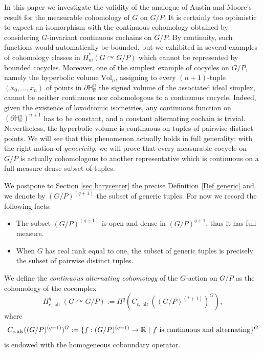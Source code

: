 \documentclass[a4paper]{amsart}
\theoremstyle{definition}
\theoremstyle{remark}
\theoremstyle{TheoremNum}
\DeclareMathOperator{\alt}{\mathrm{alt}}
\begin{document}
 

In this paper we investigate the validity of the analogue of Austin and Moore's result for the measurable cohomology of $G$ on $G/P$. It is certainly too optimistic to expect an isomorphism with the continuous cohomology obtained by considering $G$-invariant continuous cochains on $G/P$. By continuity, such functions would automatically be bounded, but we exhibited in \cite{BucSavExp} several examples of cohomology classes in $H^*_{m}(G \curvearrowright G/P)$ which cannot be represented by bounded cocycles. Moreover, one of the simplest example of cocycles on $G/P$, namely the hyperbolic volume $\mathrm{Vol}_n$, assigning to every $(n+1)$-tuple $(x_0,\ldots,x_n)$ of points in $\partial \mathbb{H}^n_{\mathbb{R}}$ the signed volume of the associated ideal simplex, cannot be neither continuous nor cohomologous to a continuous cocycle. Indeed, given the existence of loxodromic isometries, any continuous function on $(\partial\mathbb{H}^n_\mathbb{R})^{n+1}$ has to be constant, and a constant alternating cochain is trivial. Nevertheless, the hyperbolic volume is continuous on tuples of pairwise distinct points. We will see that this phenomenon actually holds in full generality: with the right notion of \emph{genericity}, we will prove that every measurable cocycle on $G/P$ is actually cohomologous to another representative which is continuous on a full measure dense subset of tuples. 


We postpone to Section \ref{sec barycenter} the precise Definition \ref{Def generic} and we denote by $(G/P)^{(q+1)}$ the subset of generic tuples. For now we record the following facts:
\begin{itemize}
\item  The subset $(G/P)^{(q+1)}$ is open and dense in $(G/P)^{q+1}$, thus it has full measure. 
\item  When $G$ has real rank equal to one, the subset of generic tuples is precisely the subset of pairwise distinct tuples. 
\end{itemize}

We define the \emph{continuous alternating cohomology} of the $G$-action on $G/P$ as the cohomology of the cocomplex
$$
H^q_{c,\alt}(G \curvearrowright G/P):=H^q(C_{c,\alt}((G/P)^{(*+1)})^G),
$$
where 
$$
C_{c,\alt}((G/P)^{(q+1)})^G:=\{ f : (G/P)^{(q+1)} \rightarrow \mathbb{R} \ | \ \textup{$f$ is continuous and alternating} \}^G
$$
is endowed with the homogeneous coboundary operator. 
\end{document}
